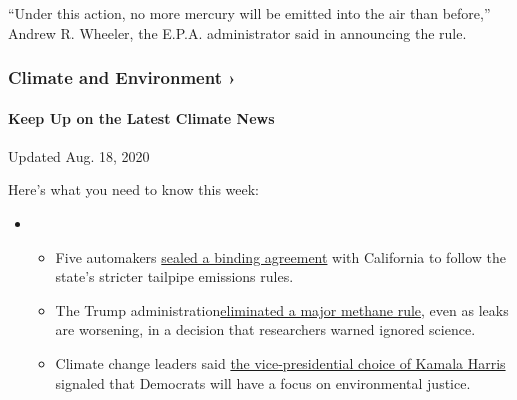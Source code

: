 ``Under this action, no more mercury will be emitted into the air than
before,'' Andrew R. Wheeler, the E.P.A. administrator said in announcing
the rule.

\href{https://www.nytimes3xbfgragh.onion/section/climate?action=click\&pgtype=Article\&state=default\&region=MAIN_CONTENT_1\&context=storylines_keepup}{}

\hypertarget{climate-and-environment-}{%
\subsubsection{Climate and Environment
›}\label{climate-and-environment-}}

\hypertarget{keep-up-on-the-latest-climate-news}{%
\paragraph{Keep Up on the Latest Climate
News}\label{keep-up-on-the-latest-climate-news}}

Updated Aug. 18, 2020

Here's what you need to know this week:

\begin{itemize}
\item
  \begin{itemize}
  \tightlist
  \item
    Five automakers
    \href{https://www.nytimes3xbfgragh.onion/2020/08/17/climate/california-automakers-pollution.html?action=click\&pgtype=Article\&state=default\&region=MAIN_CONTENT_1\&context=storylines_keepup}{sealed
    a binding agreement} with California to follow the state's stricter
    tailpipe emissions rules.
  \item
    The Trump
    administration\href{https://www.nytimes3xbfgragh.onion/2020/08/13/climate/trump-methane.html?action=click\&pgtype=Article\&state=default\&region=MAIN_CONTENT_1\&context=storylines_keepup}{eliminated
    a major methane rule}, even as leaks are worsening, in a decision
    that researchers warned ignored science.
  \item
    Climate change leaders said
    \href{https://www.nytimes3xbfgragh.onion/2020/08/12/climate/kamala-harris-environmental-justice.html?action=click\&pgtype=Article\&state=default\&region=MAIN_CONTENT_1\&context=storylines_keepup}{the
    vice-presidential choice of Kamala Harris} signaled that Democrats
    will have a focus on environmental justice.
  \end{itemize}
\end{itemize}

